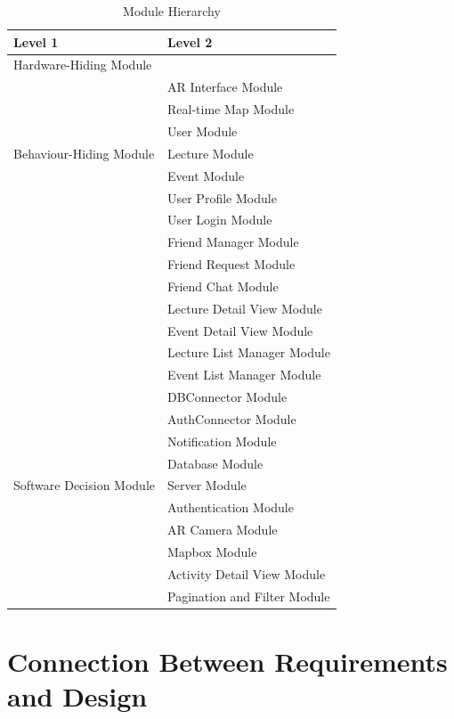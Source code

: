\documentclass[12pt, titlepage]{article}
\begin{document}
\begin{table}[H]
\centering
\begin{tabular}{p{} p{}}
\toprule
\textbf{Level 1} & \textbf{Level 2}\\
\midrule

{Hardware-Hiding Module} & ~ \\
\midrule

\multirow{7}{0.3\textwidth}{Behaviour-Hiding Module}
& AR Interface Module\\
& Real-time Map Module\\
& User Module\\
& Lecture Module\\
& Event Module\\
& User Profile Module\\
& User Login Module\\
& Friend Manager Module\\ 
& Friend Request Module\\
& Friend Chat Module\\
& Lecture Detail View Module\\
& Event Detail View Module\\
& Lecture List Manager Module\\
& Event List Manager Module\\
& DBConnector Module\\
& AuthConnector Module\\
& Notification Module\\
\midrule

\multirow{3}{0.3\textwidth}{Software Decision Module}
& Database Module\\
& Server Module\\
& Authentication Module\\
& AR Camera Module\\
& Mapbox Module\\
& Activity Detail View Module\\
& Pagination and Filter Module\\
\bottomrule

\end{tabular}
\caption{Module Hierarchy}
\label{TblMH}
\end{table}

\section{Connection Between Requirements and Design} \label{SecConnection}
\end{document}
